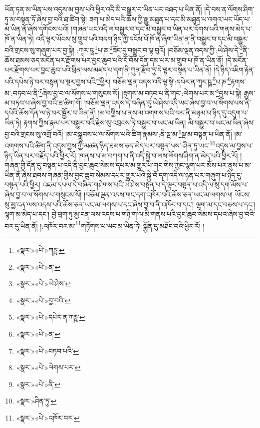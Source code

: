 ཡོན་ཏན་མ་ཡིན་པས་འདུས་མ་བྱས་པའི་ཕྱིར་འདི་མི་བསྒྱུར་བ་ཡིན་པར་འཐད་པ་ཡིན་ནོ། །དེ་བས་ན་ལོགས་ཤིག་ཏུ་མ་བསྟན་ཏོ་ཞེས་བྱ་བའི་ཐ་ཚིག་སྟེ། ཟག་པ་མེད་པའི་ཆོས་ཀྱི་རྒྱུ་མཐུན་པ་དང་མི་མཐུན་པ་འགའ་ཡང་ཡོད་པ་མ་ཡིན་ནོ་ཞེས་དགོངས་པའོ། །གཞན་ཡང་འདི་ལ་བསྒྱུར་བ་དང་མི་བསྒྱུར་བ་ཡིན་པར་དོགས་པའི་གནས་མེད་པ་ཁོ་ན་ཡིན་ཏེ། འདི་ལྟར་ཡོངས་སུ་གྲུབ་པའི་བདག་ཉིད་ཀྱི་དངོས་པོ་ཁོ་ན་ཞིག་ཡིན་ན་ནི་བསྒྱུར་བ་དང་མི་བསྒྱུར་བའི་གྲངས་སུ་གཞུག་པར་བྱ་སྟེ། :ཀཱར་ཥཱ་\footnote{«སྣར་»«པེ་»ཀཪྵ་}པ་ཎ་\footnote{«སྣར་»«པེ་»ན་}ཟོང་དུ་བསྒྱུར་བ་ལྟ་བུའོ། །བཅོམ་ལྡན་འདས་ཀྱི་:ཡེ་ཤེས་དེ་\footnote{«སྣར་»«པེ་»ཡེ་ཤེས་}ནི་ཆོས་ཐམས་ཅད་མངོན་པར་རྫོགས་པར་བྱང་ཆུབ་པའི་ངོ་བོས་དོན་དམ་པར་མ་གྲུབ་པ་ཁོ་ན་ཡིན་ནོ། །དེ་མངོན་པར་རྫོགས་པར་བྱང་ཆུབ་པའི་ཕྲིན་ལས་མཛད་པ་དག་ནི་ཀུན་རྫོབ་ཏུ་དེ་ལྟར་བསྟན་པ་ཡིན་ནོ། །དེ་ཉིད་འཇིག་རྟེན་པའི་དཔེས་ཉེ་བར་བསྟན་པ་སྔར་བྱས་པའི་\footnote{«སྣར་»«པེ་»བྱ་བའི་}ཕྱིར། བཅོམ་ལྡན་འདས་འདི་ལྟ་སྟེ་:དཔེར་ན་ཀཱར་ཥཱ་\footnote{«སྣར་»«པེ་»དཔེར་ན་ཀཪྵ་}པ་ཎ་\footnote{«སྣར་»«པེ་»ན་}རྟགས་མ་:བཏབ་པ་ནི་\footnote{«སྣར་»«པེ་»བཏབ་པའི་}ཞེས་བྱ་བ་ལ་སོགས་པ་གསུངས་སོ། །རྟགས་མ་བཏབ་པ་ནི་གང་:ལེགས་པར་མ་\footnote{«སྣར་»«པེ་»ལེགས་པར་}བྱས་པ་སྟེ། རྒྱས་མ་བཏབ་པ་ཞེས་བྱ་བའི་ཐ་ཚིག་གོ། །བཅོམ་ལྡན་འདས་དེ་བཞིན་དུ་ཡེ་ཤེས་འདི་ཡང་ཞེས་བྱ་བ་ལ་སོགས་པས་ནི་དཔེའི་ཆོས་དོན་ལ་ཉེ་བར་སྦྱོར་བ་ཡིན་ནོ། །མ་བགྱིས་པ་ནས་མ་འགགས་པའི་བར་ནི་མཉམ་པ་ཉིད་དུ་འདུག་པ་ཡིན་ཏེ། རྟགས་ཀྱིས་རྣམ་པར་བསྒྱུར་བའི་རྗེས་སུ་འབྲངས་ཏེ་བསྒྱུར་བ་ཡང་མ་ཡིན། མི་བསྒྱུར་བ་ཡང་མ་ཡིན་ཞེས་བྱ་བའི་གྲངས་སུ་འགྲོ་བའོ། །མ་བསྒྲུབས་པ་ལ་སོགས་པའི་ཚིག་རྣམས་:ནི་སྔ་མ་\footnote{«སྣར་»«པེ་»ནི་}སྔ་མ་བསྟན་པ་ཡིན་ནོ། །མ་འགགས་པའི་ཚིག་ནི་འདུས་བྱས་ཀྱི་མཚན་ཉིད་ཐམས་ཅད་མེད་པར་བསྟན་པས་:ཤིན་ཏུ་ཡང་\footnote{«སྣར་»ཤིན་ཏུ་}འདུས་མ་བྱས་པ་ཉིད་ཡིན་པར་བརྗོད་པའི་ཕྱིར་རོ། །གནས་པ་མ་བཀག་པ་ནི་འདི་སྐྱེ་བ་ལས་ལོགས་ཤིག་ན་མེད་པའི་ཕྱིར་རོ། །གཞན་གྱི་དོན་དུ་བསྟན་པ་འདི་ནི་བྱང་ཆུབ་སེམས་དཔར་མ་གྱུར་པ་གང་གིས་ཀྱང་ལྷག་པར་མོས་པར་ནུས་པ་མ་ཡིན་ནོ་ཞེས་ཐབས་གཞན་གྱིས་བྱང་ཆུབ་སེམས་དཔར་གྱུར་པའི་སྐྱེ་བོ་དག་འདི་ལ་ཉན་པར་གཞུག་པ་ཉིད་དུ་བསྟན་པའི་ཕྱིར། འཇམ་དཔལ་དེ་བཞིན་གཤེགས་པའི་ཡེ་ཤེས་བསྟན་པ་དེ་ལྟར་བསྟན་པ་འདི་ལ་སུ་དག་མོས་པ་ཞེས་བྱ་བ་ལ་སོགས་པ་གསུངས་སོ། །བཅོམ་ལྡན་འདས་གང་དག་འཁོར་བའི་ཆོས་ཅན་ཡང་མ་ལགས་ལ། ཡོངས་སུ་མྱ་ངན་ལས་འདས་པའི་ཆོས་ཅན་ཡང་མ་ལགས་པ་དང་ཞེས་བྱ་བ་ནི་འཁོར་བ་དང་། ལྷག་མ་དང་བཅས་པ་དང་། ལྷག་མ་མེད་པ་དང་། བྱེ་བྲག་ཏུ་མྱ་ངན་ལས་འདས་པ་གཉི་ག་ལ་མི་གནས་པའི་བྱང་ཆུབ་སེམས་དཔའ་ཞེས་བྱ་བའི་བར་དུ་ཡིན་ནོ། །:འཁོར་བར་མ་\footnote{«སྣར་»«པེ་»འཁོར་བར་}གཏོགས་པ་ཡང་མ་ཡིན་ཏེ། སྐྱོན་དུ་མཐོང་བའི་ཕྱིར་རོ། །
